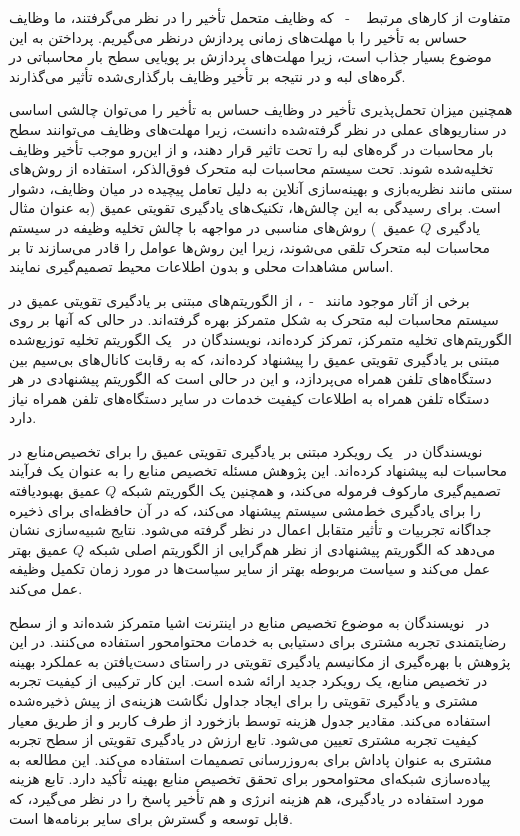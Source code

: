 متفاوت از کارهای مرتبط ~\cite{lyu2018distributed} -~\cite{neto2018uloof} که وظایف متحمل تأخیر را در نظر می‌گرفتند، ما وظایف حساس به تأخیر را با مهلت‌های زمانی پردازش درنظر می‌گیریم. پرداختن به این موضوع بسیار جذاب است، زیرا مهلت‌های پردازش بر پویایی سطح بار محاسباتی در گره‌های لبه و در نتیجه بر تأخیر وظایف بارگذاری‌شده تأثیر می‌گذارند.


همچنین میزان تحمل‌پذیری تأخیر در وظایف حساس به تأخیر را می‌توان چالشی اساسی در سناریوهای عملی در نظر گرفته‌شده دانست، زیرا مهلت‌های وظایف می‌توانند سطح بار محاسبات در گره‌های لبه را تحت تاثیر قرار دهند، و از این‌رو موجب تأخیر وظایف تخلیه‌شده شوند. تحت سیستم محاسبات لبه متحرک فوق‌الذکر، استفاده از روش‌های سنتی مانند نظریه‌بازی و بهینه‌سازی آنلاین به دلیل تعامل پیچیده در میان وظایف، دشوار است. برای رسیدگی به این چالش‌ها، تکنیک‌های یادگیری تقویتی عمیق (به عنوان مثال یادگیری $Q$ عمیق~\cite{mnih2015human}) روش‌های مناسبی در مواجهه با چالش تخلیه وظیفه در سیستم محاسبات لبه متحرک تلقی می‌شوند، زیرا این روش‌ها عوامل را قادر می‌سازند تا بر اساس مشاهدات محلی و بدون اطلاعات محیط تصمیم‌گیری نمایند.

برخی از آثار موجود مانند~\cite{huang2019deep} -~\cite{liu2019deep}، از الگوریتم‌های مبتنی بر یادگیری تقویتی عمیق در سیستم محاسبات لبه متحرک به شکل متمرکز بهره گرفته‌اند. در حالی که آنها بر روی الگوریتم‌های تخلیه متمرکز، تمرکز کرده‌اند، نویسندگان در~\cite{zhao2019deep} یک الگوریتم تخلیه توزیع‌شده مبتنی بر یادگیری تقویتی عمیق را پیشنهاد کرده‌اند، که به رقابت کانال‌های بی‌سیم بین دستگاه‌های تلفن همراه می‌پردازد، و این در حالی است که الگوریتم پیشنهادی در هر دستگاه تلفن همراه به اطلاعات کیفیت خدمات در سایر دستگاه‌های تلفن همراه نیاز دارد. 



نویسندگان در~\cite{xiong2020resource} یک رویکرد مبتنی بر یادگیری تقویتی عمیق را برای تخصیص‌منابع در محاسبات لبه پیشنهاد کرده‌اند. این پژوهش مسئله تخصیص منابع را به عنوان یک فرآیند تصمیم‌گیری مارکوف فرموله می‌کند، و همچنین یک الگوریتم شبکه $Q$ عمیق بهبود‌یافته را برای یادگیری خط‌مشی سیستم پیشنهاد می‌کند، که در آن حافظه‌ای برای ذخیره جداگانه تجربیات و تأثیر متقابل اعمال در نظر گرفته می‌شود. نتایج شبیه‌سازی نشان می‌دهد که الگوریتم پیشنهادی از نظر هم‌گرایی از الگوریتم اصلی شبکه $Q$ عمیق بهتر عمل می‌کند و سیاست مربوطه بهتر از سایر سیاست‌ها در مورد زمان تکمیل وظیفه عمل می‌کند.


در~\cite{gai2018optimal} نویسندگان به موضوع تخصیص منابع در اینترنت اشیا متمرکز شده‌اند و از سطح رضایتمندی تجربه مشتری برای دستیابی به خدمات محتوامحور استفاده می‌کنند. در این پژوهش با بهره‌گیری از مکانیسم یادگیری‌ تقویتی در راستای دست‌یافتن به عملکرد بهینه در تخصیص منابع، یک رویکرد جدید ارائه شده است. این کار ترکیبی از کیفیت تجربه مشتری و یادگیری تقویتی را برای ایجاد جداول نگاشت هزینه‌ی از پیش ذخیره‌شده استفاده می‌کند. مقادیر جدول هزینه توسط بازخورد از طرف کاربر و از طریق معیار کیفیت تجربه مشتری تعیین می‌شود. تابع ارزش در یادگیری تقویتی از سطح تجربه مشتری به عنوان پاداش برای به‌روزرسانی تصمیمات استفاده می‌کند. این مطالعه به پیاده‌سازی شبکه‌ای محتوامحور برای تحقق تخصیص منابع بهینه تأکید دارد. تابع هزینه مورد استفاده در یادگیری، هم هزینه انرژی و هم تأخیر پاسخ را در نظر می‌گیرد، که قابل توسعه و گسترش برای سایر برنامه‌ها است.  


